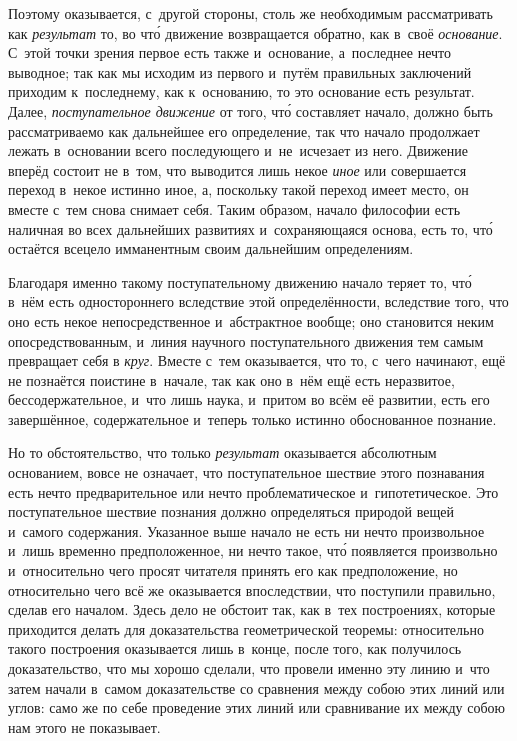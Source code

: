 Поэтому оказывается, с~другой стороны, столь же необходимым рассматривать как
{\em результат} то, во чт\'{о} движение возвращается обратно, как в~своё
{\em основание}. С~этой точки зрения первое есть также и~основание, а~последнее
нечто выводное; так как мы исходим из первого и~путём правильных заключений
приходим к~последнему, как к~основанию, то это основание есть результат. Далее,
{\em поступательное движение} от того, чт\'{о} составляет начало, должно быть
рассматриваемо как дальнейшее его определение, так что начало продолжает лежать
в~основании всего последующего и~не~исчезает из него. Движение вперёд состоит
не в~том, что выводится лишь некое {\em иное} или совершается переход в~некое
истинно иное, а, поскольку такой переход имеет место, он вместе с~тем снова
снимает себя. Таким образом, начало философии есть наличная во всех дальнейших
развитиях и~сохраняющаяся основа, есть то, чт\'{о} остаётся всецело имманентным
своим дальнейшим определениям.

Благодаря именно такому поступательному движению начало теряет то, чт\'{о}
в~нём есть одностороннего вследствие этой определённости, вследствие того, что
оно есть некое непосредственное и~абстрактное вообще; оно становится неким
опосредствованным, и~линия научного поступательного движения тем самым
превращает себя в {\em круг}. Вместе с~тем оказывается, что то, с~чего
начинают, ещё не познаётся поистине в~начале, так как оно в~нём ещё есть
неразвитое, бессодержательное, и~что лишь наука, и~притом во всём её развитии,
есть его завершённое, содержательное и~теперь только истинно обоснованное
познание.

Но то обстоятельство, что только {\em результат} оказывается абсолютным
основанием, вовсе не означает, что поступательное шествие этого познавания есть
нечто предварительное или нечто проблематическое и~гипотетическое. Это
поступательное шествие познания должно определяться природой вещей и~самого
содержания. Указанное выше начало не есть ни нечто произвольное и~лишь временно
предположенное, ни нечто такое, чт\'{о} появляется произвольно и~относительно
чего просят читателя принять его как предположение, но относительно чего всё же
оказывается впоследствии, что поступили правильно, сделав его началом. Здесь
дело не обстоит так, как в~тех построениях, которые приходится делать для
доказательства геометрической теоремы: относительно такого построения
оказывается лишь в~конце, после того, как получилось доказательство, что мы
хорошо сделали, что провели именно эту линию и~что затем начали в~самом
доказательстве со сравнения между собою этих линий или углов: само же по себе
проведение этих линий или сравнивание их между собою нам этого не показывает.

